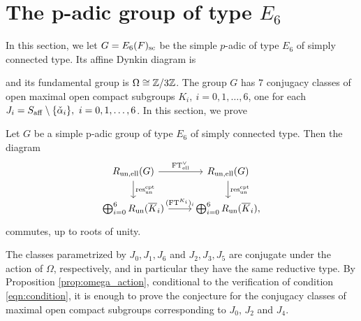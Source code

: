\section{The p-adic group of type \texorpdfstring{$E_6$}{PDFstring}}\label{sec:E6}

In this section, we let $G=E_6(F)_{\mathrm{sc}}$ be the simple $p$-adic of type $E_6$ of simply connected type. Its affine Dynkin diagram is \begin{center}
\end{center}
and its fundamental group is $\Omega\cong\mathbb{Z}/3\mathbb{Z}$. The group $G$ has $7$ conjugacy classes of open maximal open compact subgroups $K_i,\ i=0,1,\dots,6$, one for each $J_i=S_{\aff}\setminus\{\calpha_i\},\ i=0,1,\ldots,6$. In this section, we prove
\begin{theorem}\label{thm:E6sc}
    Let $G$ be a simple p-adic group of type $E_6$ of simply connected type. Then the diagram 
    \[
        \begin{tikzcd}
            R_{\un,\mathrm{ell}}(G) \arrow[r, "\FT^\vee_{\mathrm{ell}}"] \arrow[d, "\res_{\un}^{\mathrm{cpt}}"] & R_{\un,\mathrm{ell}}(G) \arrow[d, "\res_{\un}^{\mathrm{cpt}}"] \\
            \bigoplus_{i=0}^6 R_{\un}(\overline{K}_i) \arrow[r, "(\FT^{K_i})_i"] & \bigoplus_{i=0}^6 R_{\un}(\overline{K}_i),
        \end{tikzcd}
    \]
    commutes, up to roots of unity.
\end{theorem}


The classes parametrized by $J_0,J_1,J_6$ and $J_2,J_3,J_5$ are conjugate under the action of $\Omega$, respectively, and in particular they have the same reductive type. By Proposition \ref{prop:omega_action}, conditional to the verification of condition \eqref{eqn:condition}, it is enough to prove the conjecture for the conjugacy classes of maximal open compact subgroups corresponding to $J_0$, $J_2$ and $J_4$. 

